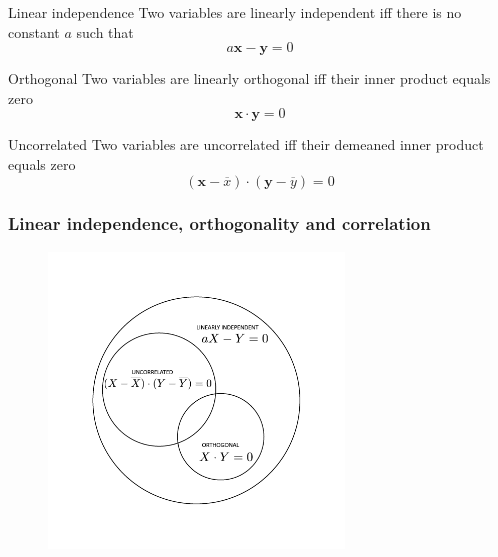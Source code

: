 \documentclass{beamer}
\begin{document}
\begin{frame}
\begin{block}{Linear independence}
Two variables are linearly independent iff there is no constant $a$ such that
$$a \textbf{x} - \textbf{y} = 0$$
\end{block}

\begin{block}{Orthogonal}
Two variables are linearly orthogonal iff their inner product equals zero
$$\textbf{x} \cdot \textbf{y}= 0$$
\end{block}

\begin{block}{Uncorrelated}
Two variables are uncorrelated iff their demeaned inner product equals zero
$$(\textbf{x} - \overline{x} ) \cdot (\textbf{y} - \overline{y}) = 0$$
\end{block}
\end{frame}

\begin{frame}
\frametitle{Linear independence, orthogonality and correlation}
\begin{figure}[t]
\begin{center}
\includegraphics[width=0.7\textwidth]{relation_venn_stats_b}
\caption{}
\end{center}
\end{figure}

\end{frame}
\end{document}
